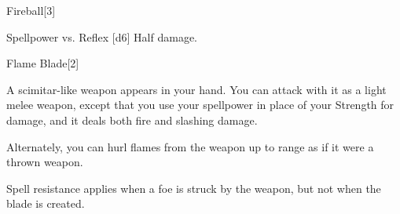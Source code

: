 \begin{spellsection}{Fireball}[3]
    \begin{spellheader}
    \end{spellheader}
    \begin{spellcontent}
        \begin{spelltargetinginfo}
        \end{spelltargetinginfo}
        \begin{spelleffects}
            \begin{spellattack}{Spellpower vs. Reflex}
                \spellsuccess {}[d6]
                \spellfailure Half damage.
            \end{spellattack}
        \end{spelleffects}
    \end{spellcontent}
    \begin{spellfooter}
        \spellnotes \destructivespellnotes

        \firespellnotes
        \miscastyou
    \end{spellfooter}
\end{spellsection}

\begin{spellsection}{Flame Blade}[2]
    \begin{spellheader}
    \end{spellheader}
    \begin{spellcontent}
        \begin{spelleffects}
            \spelleffect A scimitar-like weapon appears in your hand. You can attack with it as a light melee weapon, except that you use your spellpower in place of your Strength for damage, and it deals both fire and slashing damage.

            Alternately, you can hurl flames from the weapon up to \rngmed range as if it were a thrown weapon.

            \spelldur \durmed \dismissable
        \end{spelleffects}
    \end{spellcontent}
    \begin{spellfooter}
        \spellnotes Spell resistance applies when a foe is struck by the weapon, but not when the blade is created.
        \firespellnotes
        \miscastexplode
    \end{spellfooter}
\end{spellsection}

